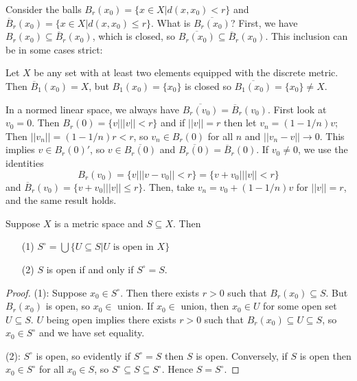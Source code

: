 \begin{example}
    Consider the balls $B_r(x_0) = \{x \in X\vert d(x,x_0) < r\}$ and $\overline{B}_r(x_0) = \{x \in X\vert d(x,x_0) \leq r\}$. What is $\overline{B_r(x_0)}$? First, we have $B_r(x_0) \subseteq \overline{B}_r(x_0)$, which is closed, so $\overline{B_r(x_0)} \subseteq \overline{B}_r(x_0)$. This inclusion can be in some cases strict:

    Let $X$ be any set with at least two elements equipped with the discrete metric. Then $\overline{B}_1(x_0) = X$, but $B_1(x_0) = \{x_0\}$ is closed so $\overline{B_1(x_0)} = \{x_0\} \neq X$. 

    In a normed linear space, we always have $\overline{B_r(v_0)} = \overline{B}_r(v_0)$. First look at $v_0 = 0$. Then $B_r(0) = \{v \vert ||v|| < r\}$ and if $||v|| = r$ then let $v_n = (1-1/n)v$; Then $||v_n|| = (1-1/n)r < r$, so $v_n \in B_r(0)$ for all $n$ and $||v_n-v||\rightarrow 0$. This implies $v \in B_r(0)'$, so $v \in \overline{B_r(0)}$ and $\overline{B_r(0)} = \overline{B}_r(0)$. If $v_0\neq 0$, we use the identities $$B_r(v_0) = \{v\vert ||v-v_0|| < r\} = \{v+v_0\vert ||v|| < r\}$$ and $\overline{B}_r(v_0) = \{v+v_0\vert ||v|| \leq r\}$. Then, take $v_n = v_0 + (1-1/n)v$ for $||v|| = r$, and the same result holds.
\end{example}


\begin{proposition}
    Suppose $X$ is a metric space and $S \subseteq X$. Then \begin{itemize}
        \item[(1)] $S^{\circ} = \bigcup\{U\subseteq S\vert \text{$U$ is open in $X$}\}$
        \item[(2)] $S$ is open if and only if $S^{\circ} = S$.
    \end{itemize}
\end{proposition}
\begin{proof}
    (1): Suppose $x_0 \in S^{\circ}$. Then there exists $r > 0$ such that $B_r(x_0) \subseteq S$. But $B_r(x_0)$ is open, so $x_0 \in $ union. If $x_0 \in $ union, then $x_0 \in U$ for some open set $U \subseteq S$. $U$ being open implies there exists $r > 0$ such that $B_r(x_0) \subseteq U \subseteq S$, so $x_0 \in S^{\circ}$ and we have set equality.

    (2): $S^{\circ}$ is open, so evidently if $S^{\circ} =S$ then $S$ is open. Conversely, if $S$ is open then $x_0 \in S^{\circ}$ for all $x_0 \in S$, so $S^{\circ} \subseteq S \subseteq S^{\circ}$. Hence $S = S^{\circ}$.
\end{proof} 

